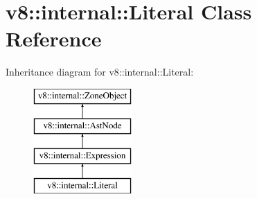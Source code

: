 \hypertarget{classv8_1_1internal_1_1_literal}{}\section{v8\+:\+:internal\+:\+:Literal Class Reference}
\label{classv8_1_1internal_1_1_literal}
Inheritance diagram for v8\+:\+:internal\+:\+:Literal\+:\begin{figure}[H]
\begin{center}
\leavevmode
\includegraphics[height=4.000000cm]{classv8_1_1internal_1_1_literal}
\end{center}
\end{figure}
